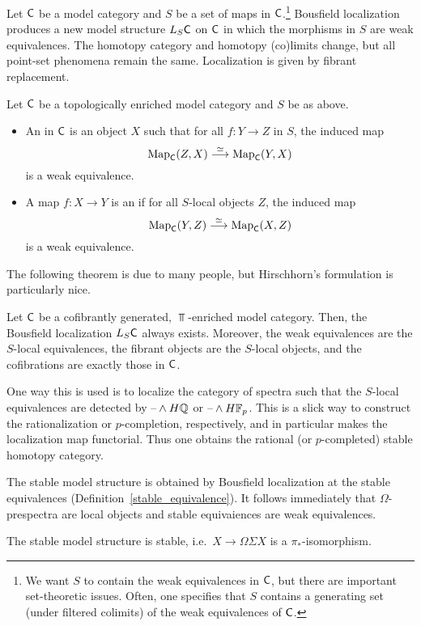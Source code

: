 Let $\mathsf C$ be a model category and $S$ be a set of maps in $\mathsf C$.\footnote{We want $S$ to contain the weak
equivalences in $\mathsf C$, but there are important set-theoretic issues. Often, one specifies that $S$ contains a
generating set (under filtered colimits) of the weak equivalences of $\mathsf C$.} Bousfield localization produces a new
model structure $L_S\mathsf C$ on $\mathsf C$ in which the morphisms in $S$ are weak equivalences. The homotopy category and
homotopy (co)limits change, but all point-set phenomena remain the same. Localization is given by fibrant
replacement.
\begin{defn}
Let $\mathsf C$ be a topologically enriched model category and $S$ be as above.
\begin{itemize}
	\item An  in $\mathsf C$ is an object $X$ such that for all $f\colon Y\to Z$ in $S$, the
	induced map
	\[\operatorname{Map}_\mathsf C(Z,X)\stackrel\simeq\longrightarrow \operatorname{Map}_\mathsf C(Y, X)\]
	is a weak equivalence.
	\item A map $f\colon X\to Y$ is an  if for all $S$-local objects $Z$, the induced map
	\[\operatorname{Map}_\mathsf C(Y,Z)\stackrel\simeq\longrightarrow \operatorname{Map}_\mathsf C(X,Z)\]
	is a weak equivalence.
\end{itemize}
\end{defn}
The following theorem is due to many people, but Hirschhorn's formulation is particularly nice.
\begin{thm}
Let $\mathsf C$ be a cofibrantly generated, $\Top$-enriched model category. Then, the Bousfield localization $L_S\mathsf C$
always exists. Moreover, the weak equivalences are the $S$-local equivalences, the fibrant objects are the
$S$-local objects, and the cofibrations are exactly those in $\mathsf C$.
\end{thm}
\begin{exm}
One way this is used is to localize the category of spectra such that the $S$-local equivalences are detected by
$\text{--}\wedge H\mathbb Q$ or $\text{--}\wedge H\mathbb F_p$. This is a slick way to construct the rationalization or $p$-completion,
respectively, and in particular makes the localization map functorial. Thus one obtains the rational (or
$p$-completed) stable homotopy category.
\end{exm}
The stable model structure is obtained by Bousfield localization at the stable equivalences
(Definition~\ref{stable_equivalence}). It follows immediately that $\Omega$-prespectra are local objects and stable
equivaiences are weak equivalences.
\begin{prop}
The stable model structure is stable, i.e.\ $X\to\Omega\Sigma X$ is a $\pi_*$-isomorphism.
\end{prop}
